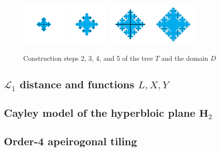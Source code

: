 \begin{figure}
    \centering
    \includegraphics[width=0.2\textwidth]{images/cayley-tree-4-border-2}
    \includegraphics[width=0.2\textwidth]{images/cayley-tree-4-border-3}
    \includegraphics[width=0.2\textwidth]{images/cayley-tree-4-border-4}
    \includegraphics[width=0.2\textwidth]{images/cayley-tree-4-border-5}
    \caption{Construction steps 2, 3, 4, and 5 of the tree $T$ and the domain $D$}
\end{figure}

\subsection{$\mathcal{L}_1$ distance and functions $L, X, Y$ }\label{sec:fields}

\subsection{Cayley model of the hyperbloic plane $\mathbf{H}_2$}\label{sec:model}

\subsection{Order-4 apeirogonal tiling}\label{sec:tilling}

